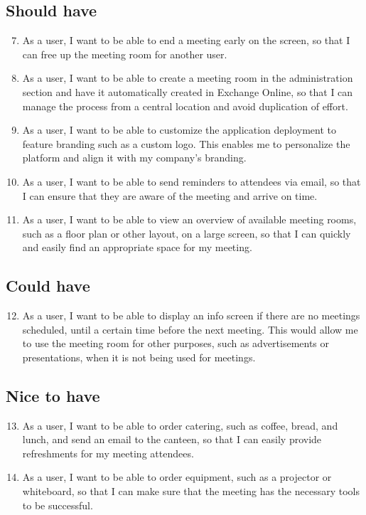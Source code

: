 \subsection*{Should have}
\begin{enumerate}
\setcounter{enumi}{6}
\item As a user, I want to be able to end a meeting early on the screen, so that I can free up the meeting room for another user.
\item As a user, I want to be able to create a meeting room in the administration section and have it automatically created in Exchange Online, so that I can manage the process from a central location and avoid duplication of effort.
\item As a user, I want to be able to customize the application deployment to feature branding such as a custom logo. This enables me to personalize the platform and align it with my company's branding.
\item As a user, I want to be able to send reminders to attendees via email, so that I can ensure that they are aware of the meeting and arrive on time.
\item As a user, I want to be able to view an overview of available meeting rooms, such as a floor plan or other layout, on a large screen, so that I can quickly and easily find an appropriate space for my meeting.
\end{enumerate}

\subsection*{Could have}
\begin{enumerate}
\setcounter{enumi}{11}
\item As a user, I want to be able to display an info screen if there are no meetings scheduled, until a certain time before the next meeting. This would allow me to use the meeting room for other purposes, such as advertisements or presentations, when it is not being used for meetings.
\end{enumerate}

\subsection*{Nice to have}
\begin{enumerate}
\setcounter{enumi}{12}
\item As a user, I want to be able to order catering, such as coffee, bread, and lunch, and send an email to the canteen, so that I can easily provide refreshments for my meeting attendees.
\item As a user, I want to be able to order equipment, such as a projector or whiteboard, so that I can make sure that the meeting has the necessary tools to be successful.
\end{enumerate}